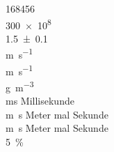 

\num{168456} \\ %
\num{300e8} \\ %
\num{1,5 +- 0,1} \\ %
\si{\meter\per\second} \\
\si[per-mode=fraction]{\meter\per\second} \\ %
\si[per-mode=reciprocal]{\gram\per\cubic\meter} \\ %
\si{\milli\second} Millisekunde \\
\si{\meter\second} Meter mal Sekunde \\
\si[inter-unit-product=\cdot]{\meter\second} Meter mal Sekunde
\\
\SI{5}{\percent} %



